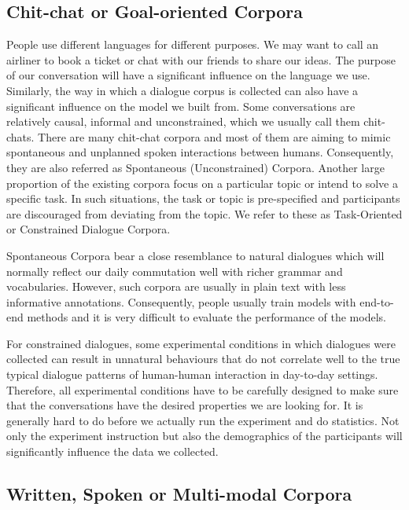 \documentclass[bsc,frontabs,twoside,singlespacing,parskip,deptreport]{infthesis}     %
\begin{document}
\subsection{Chit-chat or Goal-oriented Corpora}

People use different languages for different purposes. We may want to call an airliner to book a ticket or chat with our friends to share our ideas. The purpose of our conversation will have a significant influence on the language we use. Similarly, the way in which a dialogue corpus is collected can also have a significant influence on the model we built from. Some conversations are relatively causal, informal and unconstrained, which we usually call them chit-chats. There are many chit-chat corpora and most of them are aiming to mimic spontaneous and unplanned spoken interactions between humans. Consequently, they are also referred as Spontaneous (Unconstrained) Corpora. Another large proportion of the existing corpora focus on a particular topic or intend to solve a specific task. In such situations, the task or topic is pre-specified and participants are discouraged from deviating from the topic. We refer to these as Task-Oriented or Constrained Dialogue Corpora.

Spontaneous Corpora bear a close resemblance to natural dialogues which will normally reflect our daily commutation well with richer grammar and vocabularies. However, such corpora are usually in plain text with less informative annotations. Consequently, people usually train models with end-to-end methods and it is very difficult to evaluate the performance of the models.  

For constrained dialogues, some experimental conditions in which dialogues were collected can result in unnatural behaviours that do not correlate well to the true typical dialogue patterns of human-human interaction in day-to-day settings. Therefore, all experimental conditions have to be carefully designed to make sure that the conversations have the desired properties we are looking for. It is generally hard to do before we actually run the experiment and do statistics. Not only the experiment instruction but also the demographics of the participants will significantly influence the data we collected\cite{ai2007comparing,young2013pomdp}.


\subsection{Written, Spoken or Multi-modal Corpora}
\end{document}
